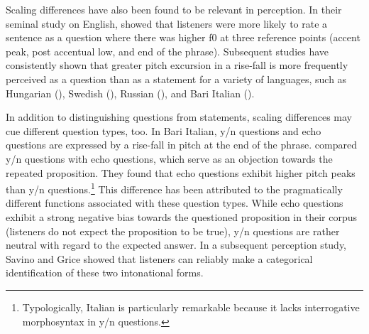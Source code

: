 Scaling differences have also been found to be relevant in perception. In their seminal study on English, \citet{HaddingStuddert1964} showed that listeners were more likely to rate a sentence as a question where there was higher f0 at three reference points (accent peak, post accentual low, and end of the phrase). Subsequent studies have consistently shown that greater pitch excursion in a rise-fall is more frequently perceived as a question than as a statement for a variety of languages, such as Hungarian (\citealt{GosyTerken1994}), Swedish (\citealt{House2003}), Russian (\citealt{Makarova2007}), and Bari Italian (\citealt{SavinoGrice2007}).

In addition to distinguishing questions from statements, scaling differences may cue different question types, too. In Bari Italian, y/n questions and echo questions are expressed by a rise-fall in pitch at the end of the phrase. \citet{SavinoGrice2011} compared y/n questions with echo questions, which serve as an objection towards the repeated proposition. They found that echo questions exhibit higher pitch peaks than y/n questions.\footnote{Typologically, Italian is particularly remarkable because it lacks interrogative morphosyntax in y/n questions.} This difference has been attributed to the pragmatically different functions associated with these question types. While echo questions exhibit a strong negative bias towards the questioned proposition in their corpus (listeners do not expect the proposition to be true), y/n questions are rather neutral with regard to the expected answer. In a subsequent perception study, Savino and Grice showed that listeners can reliably make a categorical identification of these two intonational forms. 

